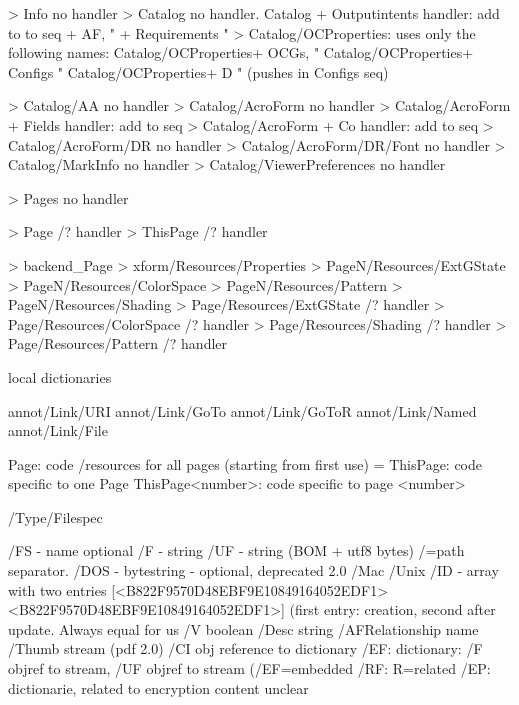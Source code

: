 >  {Info}                                 no handler
>  {Catalog}                              no handler.
   {Catalog}             + Outputintents  handler: add to to seq
                         + AF,             "
                         + Requirements    "
>  {Catalog/OCProperties}: uses only the following names:
   {Catalog/OCProperties}+ OCGs,           "
   {Catalog/OCProperties}+ Configs         "
   {Catalog/OCProperties}+ D               " (pushes in Configs seq)

>  {Catalog/AA}                            no handler
>  {Catalog/AcroForm}                      no handler
>  {Catalog/AcroForm}    + Fields          handler: add to seq
>  {Catalog/AcroForm}    + Co              handler: add to seq
>  {Catalog/AcroForm/DR}                   no handler
>  {Catalog/AcroForm/DR/Font}              no handler
>  {Catalog/MarkInfo}                      no handler
>  {Catalog/ViewerPreferences}             no handler

>  {Pages}                                 no handler

>  {Page}                                /? handler
>  {ThisPage}                            /? handler

>  {backend_Page}
>  {xform/Resources/Properties}
>  {PageN/Resources/ExtGState}
>  {PageN/Resources/ColorSpace}
>  {PageN/Resources/Pattern}
>  {PageN/Resources/Shading}
>  {Page/Resources/ExtGState}           /? handler
>  {Page/Resources/ColorSpace}          /? handler
>  {Page/Resources/Shading}             /? handler
>  {Page/Resources/Pattern}             /? handler


local dictionaries

annot/Link/URI
annot/Link/GoTo
annot/Link/GoToR
annot/Link/Named
annot/Link/File



Page:             code /resources for all pages (starting from first use) = \pageattr
ThisPage:         code specific to one Page
ThisPage<number>: code specific to page <number>



/Type/Filespec%

/FS  - name optional
/F   - string
/UF  - string (BOM + utf8 bytes) /=path separator.
/DOS - bytestring - optional, deprecated 2.0
/Mac
/Unix
/ID - array with two entries [<B822F9570D48EBF9E10849164052EDF1> <B822F9570D48EBF9E10849164052EDF1>]
      (first entry: creation, second after update. Always equal for us
/V boolean
/Desc string
/AFRelationship name
/Thumb stream (pdf 2.0)
/CI  obj reference to dictionary
/EF: dictionary: /F objref to stream, /UF objref to stream (/EF=embedded
/RF: R=related
/EP: dictionarie, related to encryption content unclear


